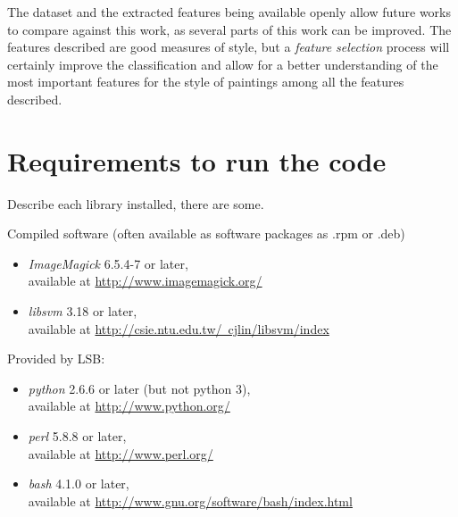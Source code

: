 \documentclass[11pt,a4paper,twoside,openright]{report}
\renewcommand{\bibname}{References}
\begin{document}
The dataset and the extracted features being available openly allow future
works to compare against this work, as several parts of this work can be
improved.  The features described are good measures of style, but a
\emph{feature selection} process will certainly improve the classification and
allow for a better understanding of the most important features for the style
of paintings among all the features described.


\newpage
{}
\addcontentsline{toc}{chapter}{\bibname}



\appendix

\chapter{Requirements to run the code}
\label{chap:requirements}

Describe each library installed, there are some.

Compiled software (often available as software packages as .rpm or .deb)
\begin{itemize}
\item[]\emph{ImageMagick} 6.5.4-7 or later, \\
available at \href{http://www.imagemagick.org/}{http://www.imagemagick.org/}

\item[]\emph{libsvm} 3.18 or later, \\
available at \href{http://csie.ntu.edu.tw/~cjlin/libsvm/index}
{http://csie.ntu.edu.tw/~cjlin/libsvm/index}
\end{itemize}

Provided by LSB:
\begin{itemize}
\item[]\emph{python} 2.6.6 or later (but not python 3), \\
available at \href{http://www.python.org/}{http://www.python.org/}

\item[]\emph{perl} 5.8.8 or later, \\
available at \href{http://www.perl.org/}{http://www.perl.org/}

\item[]\emph{bash} 4.1.0 or later, \\
available at \href{http://www.gnu.org/software/bash/index.html}
{http://www.gnu.org/software/bash/index.html}
\end{itemize}
\end{document}
